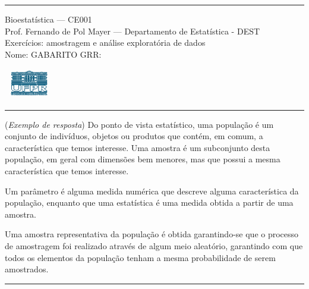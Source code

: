 \documentclass[a4paper,11pt,fleqn]{article}\usepackage[]{graphicx}\usepackage[]{color}
\theoremstyle{definition}
\begin{document}
\reversemarginpar %





\hrule
\vspace{0.3cm}

\begin{minipage}[c]{.85\textwidth}
  Bioestatística --- CE001 \\
  Prof. Fernando de Pol Mayer --- Departamento de Estatística - DEST \\
  Exercícios: amostragem e análise exploratória de dados \\
  Nome: GABARITO  \hfill GRR: \hspace{2cm}
\end{minipage}\hfill
\begin{minipage}[c]{.15\textwidth}
\flushright
\includegraphics[width=2.2cm]{../img/ufpr-logo.png}
\end{minipage}

\vspace{0.3cm}
\hrule
\vspace{0.3cm}

\begin{compactenum}[1.]
\item (\textit{Exemplo de resposta}) Do ponto de vista estatístico, uma
  população é um conjunto de indivíduos, objetos ou produtos que contém,
  em comum, a característica que temos interesse. Uma amostra é um
  subconjunto desta população, em geral com dimensões bem menores, mas
  que possui a mesma característica que temos interesse.

  Um parâmetro é alguma medida numérica que descreve alguma
  característica da população, enquanto que uma estatística é uma medida
  obtida a partir de uma amostra.

  Uma amostra representativa da população é obtida garantindo-se que o
  processo de amostragem foi realizado através de algum meio aleatório,
  garantindo com que todos os elementos da população tenham a mesma
  probabilidade de serem amostrados.
\end{compactenum}

\vspace{0.3cm}
\hrule
\vspace{0.3cm}
\end{document}
